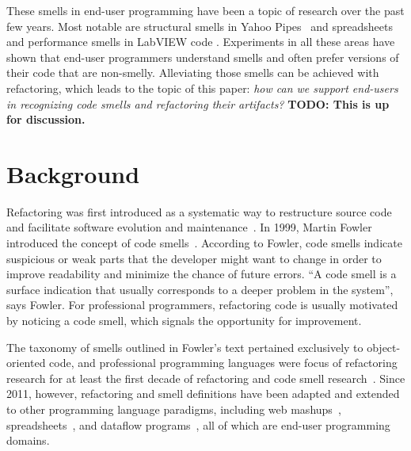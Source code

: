 \documentclass[10pt,conference,compsocconf]{IEEEtran}
\newcommand{\todo}[1]{\textbf{TODO: #1}}
\begin{document}
These smells in end-user programming have been a topic of research over the past few years. Most notable are structural smells in Yahoo Pipes~\cite{Stolee2011} and spreadsheets \cite{Hermans2012inter} and performance smells in LabVIEW code \cite{chambers2013smell}. Experiments in all these areas have shown that end-user programmers understand smells and often prefer versions of their code that are non-smelly. Alleviating those smells can be achieved with refactoring, which leads to the topic of this paper: \emph{how can we support end-users in recognizing code smells and refactoring their artifacts?} \todo{This is up for discussion.}

\section{Background}
\label{sec:background}


Refactoring was first introduced as a systematic way to restructure source code and facilitate software evolution and maintenance~\cite{Opdyke:1992:ROF:169783, Griswold:1993:AAP:152388.152389}. In 1999, Martin Fowler introduced the concept of code smells~\cite{Fowl1999}. 
According to Fowler, code smells indicate suspicious or weak parts that the developer might want to change in order to improve readability and minimize the chance of future errors. ``A code smell is a surface indication that usually corresponds to a deeper problem in the system'', says Fowler. For professional programmers, refactoring code is usually motivated by noticing a code smell, which signals the opportunity for improvement.


The taxonomy of smells outlined in Fowler's text pertained exclusively to object-oriented code, and professional programming languages were focus of refactoring research for at least the first decade of refactoring and code smell research~\cite{Mens:2004:SSR:972215.972286}.  Since 2011, however, refactoring and smell definitions have been adapted and extended to other 
programming language paradigms, including web mashups~\cite{Stolee2011, StoleeTSE2013}, spreadsheets~\cite{Hermans2011, Hermans2012inter, hermans2014bumblebee}, and dataflow programs~\cite{chambers2013smell}, all of which are  end-user programming domains. 
\end{document}
